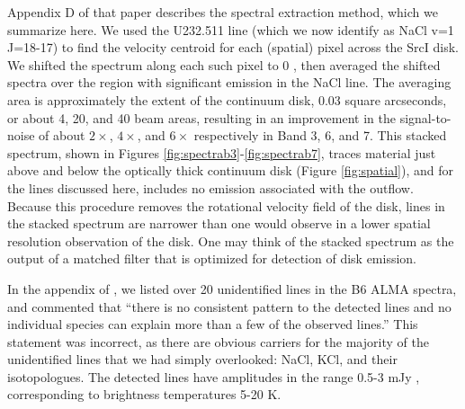 \documentclass[twocolumn]{aastex62}
\newcommand{\sourcei}{SrcI\xspace}
\begin{document}
Appendix D of that paper describes the spectral extraction method,
which we summarize here.  We used the U232.511 line (which we now identify as
NaCl v=1 J=18-17) to find the velocity centroid for each (spatial) pixel
across the \sourcei disk.  We shifted the spectrum along
each such pixel to 0 \kms, then averaged the shifted spectra over the region with
significant emission in the NaCl line.  
The
averaging area is approximately the extent of the continuum disk, 0.03 square
arcseconds, or about 4, 20, and 40  beam areas, resulting
in an improvement in the signal-to-noise of about $2\times$, $4\times$, and $6\times$
respectively in Band 3, 6, and 7.
This stacked spectrum, shown in Figures \ref{fig:spectrab3}-\ref{fig:spectrab7},
traces material just above and below the optically thick continuum disk
(Figure \ref{fig:spatial}), and for the lines discussed here, includes no
emission associated with the outflow.  
Because this procedure removes the rotational velocity field of the disk,
lines in the stacked spectrum are narrower than one would observe in
a lower spatial resolution observation of the disk.  One may think of the
stacked spectrum as the output of a matched filter that is optimized for
detection of disk emission.



In the appendix of \citet{Ginsburg2018b}, we listed over 20 unidentified 
lines in the B6 ALMA spectra, and commented that ``there is no
consistent pattern to the detected lines and no individual species can explain
more than a few of the observed lines.''  This statement was incorrect, as
there are obvious carriers for the majority of the unidentified lines that we
had simply overlooked: NaCl, KCl, and their isotopologues.  The
detected lines have amplitudes in the range 0.5-3 mJy \perbeam, corresponding
to brightness temperatures 5-20 K.  
\end{document}
